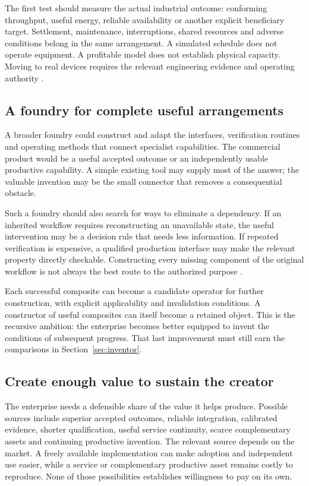 The first test should measure the actual industrial outcome: conforming throughput, useful energy, reliable availability or another explicit beneficiary target. Settlement, maintenance, interruptions, shared resources and adverse conditions belong in the same arrangement. A simulated schedule does not operate equipment. A profitable model does not establish physical capacity. Moving to real devices requires the relevant engineering evidence and operating authority \cite{frontier}.

\subsection{A foundry for complete useful arrangements}
A broader foundry could construct and adapt the interfaces, verification routines and operating methods that connect specialist capabilities. The commercial product would be a useful accepted outcome or an independently usable productive capability. A simple existing tool may supply most of the answer; the valuable invention may be the small connector that removes a consequential obstacle.

Such a foundry should also search for ways to eliminate a dependency. If an inherited workflow requires reconstructing an unavailable state, the useful intervention may be a decision rule that needs less information. If repeated verification is expensive, a qualified production interface may make the relevant property directly checkable. Constructing every missing component of the original workflow is not always the best route to the authorized purpose \cite{ti,world,original}.

Each successful composite can become a candidate operator for further construction, with explicit applicability and invalidation conditions. A constructor of useful composites can itself become a retained object. This is the recursive ambition: the enterprise becomes better equipped to invent the conditions of subsequent progress. That last improvement must still earn the comparisons in Section~\ref{sec:inventor}.

\subsection{Create enough value to sustain the creator}
The enterprise needs a defensible share of the value it helps produce. Possible sources include superior accepted outcomes, reliable integration, calibrated evidence, shorter qualification, useful service continuity, scarce complementary assets and continuing productive invention. The relevant source depends on the market. A freely available implementation can make adoption and independent use easier, while a service or complementary productive asset remains costly to reproduce. None of those possibilities establishes willingness to pay on its own.

